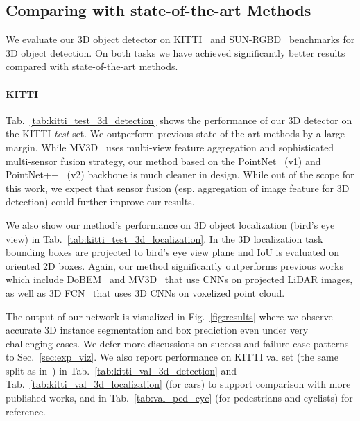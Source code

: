 \documentclass[10pt,twocolumn,letterpaper]{article}
\begin{document}
\subsection{Comparing with state-of-the-art Methods} \label{sec:exp_benchmark}
We evaluate our 3D object detector on KITTI~\cite{Geiger2012CVPR} and SUN-RGBD~\cite{song2015sun} benchmarks for 3D object detection. On both tasks we have achieved significantly better results compared with state-of-the-art methods.



\paragraph{KITTI} Tab.~\ref{tab:kitti_test_3d_detection} shows the performance of our 3D detector on the KITTI \emph{test} set. We outperform previous state-of-the-art methods by a large margin. While MV3D~\cite{cvpr17chen} uses multi-view feature aggregation and sophisticated multi-sensor fusion strategy, our method based on the PointNet~\cite{qi2017pointnet} (v1) and PointNet++~\cite{qi2017pointnetplusplus} (v2) backbone is much cleaner in design. While out of the scope for this work, we expect that sensor fusion (esp. aggregation of image feature for 3D detection) could further improve our results.

We also show our method's performance on 3D object localization (bird's eye view) in Tab.~\ref{tab:kitti_test_3d_localization}. In the 3D localization task bounding boxes are projected to bird's eye view plane and IoU is evaluated on oriented 2D boxes. Again, our method significantly outperforms previous works which include DoBEM~\cite{yuvehicle} and MV3D~\cite{cvpr17chen} that use CNNs on projected LiDAR images, as well as 3D FCN~\cite{li20163d} that uses 3D CNNs on voxelized point cloud. 


The output of our network is visualized in Fig.~\ref{fig:results} where we observe accurate 3D instance segmentation and box prediction even under very challenging cases. We defer more discussions on success and failure case patterns to Sec.~\ref{sec:exp_viz}. We also report performance on KITTI val set (the same split as in~\cite{cvpr17chen}) in Tab.~\ref{tab:kitti_val_3d_detection} and Tab.~\ref{tab:kitti_val_3d_localization} (for cars) to support comparison with more published works, and in Tab.~\ref{tab:val_ped_cyc} (for pedestrians and cyclists) for reference.
\end{document}
